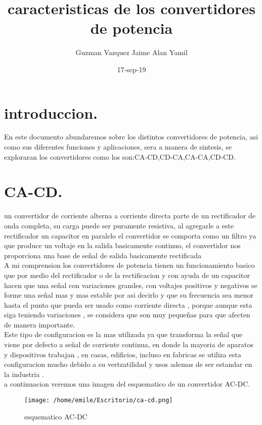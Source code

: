\documentclass[11pt]{article}
\title{\textbf{
caracteristicas de los convertidores de potencia}}
\author{Guzman Vazquez Jaime Alan Yamil}
\date{17-sep-19}
\begin{document}
\maketitle

\section{introduccion.}

En este documento abundaremos sobre los distintos convertidores de potencia, asi como sus diferentes funciones y aplicaciones, sera a manera de sintesis, se exploraran los convertidores como los son:CA-CD,CD-CA,CA-CA,CD-CD.

\maketitle
\section{CA-CD.}
un convertidor de corriente alterna a corriente directa parte de un rectificador de onda completa, su carga puede ser puramente resistiva, al agregarle a este rectificador un capacitor en paralelo el convertidor se comporta como un filtro ya que produce un voltaje en la salida basicamente continuo,
el convertidor nos proporciona una base de señal de salida basicamente rectificada\\
A mi comprension los convertidores de potencia  tienen un funcionamiento basico que por medio del rectificador o de la rectificacion y con ayuda de un capacitor hacen que una señal con variaciones grandes, con voltajes positivos y negativos se forme una señal mas y mas estable por asi decirlo y que su frecuencia sea menor hasta el punto que pueda ser usado como corriente directa , porque aunque esta siga teniendo variaciones , se considera que son muy pequeñas para que afecten de manera importante.\\
Este tipo de configuracion es la mas utilizada ya que transforma la señal que viene por defecto a señal de corriente continua, en donde la mayoria de aparatos y dispositivos trabajan , en casas, edificios, incluso en fabricas se utiliza esta configuracion mucho debido a su vertzatilidad y usos ademas de ser estandar en la industria .\\
a continuacion veremos una imagen del esquematico de un convertidor AC-DC.\\
\begin{figure}[htp]
\centering
\texttt{[image: /home/emile/Escritorio/ca-cd.png]}
\caption{esquematico AC-DC}
\label{esquematico AC-DC}
\end{figure}
 
\end{document}

